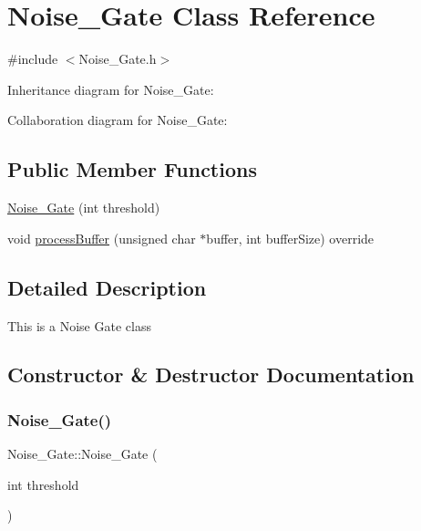 \hypertarget{classNoise__Gate}{}\section{Noise\+\_\+\+Gate Class Reference}
\label{classNoise__Gate}


{\ttfamily \#include $<$Noise\+\_\+\+Gate.\+h$>$}



Inheritance diagram for Noise\+\_\+\+Gate\+:


Collaboration diagram for Noise\+\_\+\+Gate\+:
\subsection*{Public Member Functions}
\begin{DoxyCompactItemize}
\item 
\hyperlink{classNoise__Gate_a125399a743791634f60e0d1425d79e35}{Noise\+\_\+\+Gate} (int threshold)
\item 
void \hyperlink{classNoise__Gate_a1b30bc5ccc45774528a8f44ba0632291}{process\+Buffer} (unsigned char $\ast$buffer, int buffer\+Size) override
\end{DoxyCompactItemize}


\subsection{Detailed Description}
This is a Noise Gate class 

\subsection{Constructor \& Destructor Documentation}
\mbox{\label{classNoise__Gate_a125399a743791634f60e0d1425d79e35}} 
\subsubsection{\texorpdfstring{Noise\+\_\+\+Gate()}{Noise\_Gate()}}
{\footnotesize\ttfamily Noise\+\_\+\+Gate\+::\+Noise\+\_\+\+Gate (\begin{DoxyParamCaption}\item[{int}]{threshold }\end{DoxyParamCaption})}

